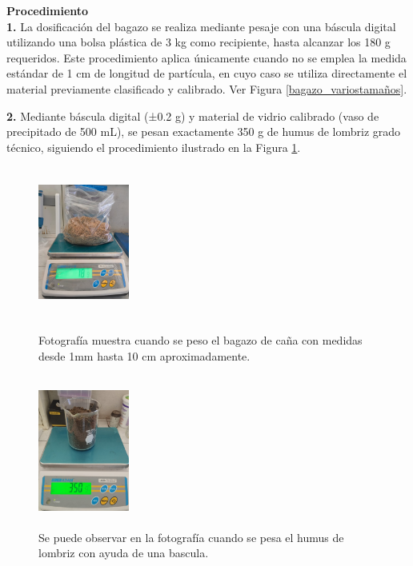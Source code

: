 \documentclass[12pt]{article}
\begin{document}
			
			\textbf{Procedimiento}
			\\[0.5em]
			\textbf{1.}	La dosificación del bagazo se realiza mediante pesaje con una báscula digital utilizando una bolsa plástica de 3 kg como recipiente, hasta alcanzar los 180 g requeridos. Este procedimiento aplica únicamente cuando no se emplea la medida estándar de 1 cm de longitud de partícula, en cuyo caso se utiliza directamente el material previamente clasificado y calibrado. Ver Figura \ref{bagazo_variostamaños}.
		
			
			\textbf{2.}	Mediante báscula digital (±0.2 g) y material de vidrio calibrado (vaso de precipitado de 500 mL), se pesan exactamente 350 g de humus de lombriz grado técnico, siguiendo el procedimiento ilustrado en la Figura \ref{humus}.
			
			
				\begin{figure}[H]
				\centering
				\begin{minipage}{0.46\textwidth}
						\centering
					\includegraphics[width=3cm, height=5cm]{imagenes/pesado2}
					\caption{Fotografía muestra cuando se peso el bagazo de caña con medidas desde 1mm  hasta 10 cm aproximadamente.}
					\label{bagazo_variostamaños}
				\end{minipage}
				\hfill
				\begin{minipage}{0.48\textwidth}
				\centering
				\includegraphics[width=3cm, height=5cm]{imagenes/humus}
				\caption{Se puede observar en la fotografía cuando se pesa el humus de lombriz con ayuda de una bascula.}
				\label{humus}
				\end{minipage}
			\end{figure}
			
\end{document}
